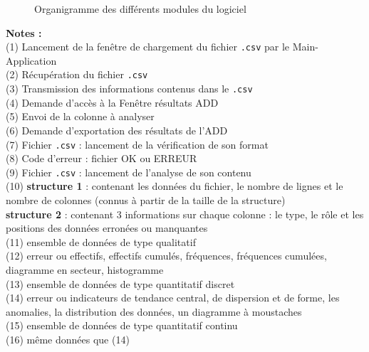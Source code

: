 \begin{figure}[h]
				\caption{Organigramme des différents modules du logiciel}\label{fig:M1}
				\end{figure}
				
				\textbf{Notes :}\\
				(1) Lancement de la fenêtre de chargement du fichier \lstinline!.csv! par le Main-Application\\
				(2) Récupération du fichier \lstinline!.csv! \\
				(3) Transmission des informations contenus dans le \lstinline!.csv!\\
				(4) Demande d'accès à la Fenêtre résultats ADD\\
				(5) Envoi de la colonne à analyser\\
				(6) Demande d'exportation des résultats de l'ADD\\
				(7) Fichier \lstinline!.csv! : lancement de la vérification de son format\\
				(8) Code d'erreur : fichier OK ou ERREUR\\
				(9) Fichier \lstinline!.csv! : lancement de l'analyse de son contenu\\
				(10) \textbf{structure 1} : contenant les données du fichier, le nombre de lignes et le nombre de colonnes (connus à partir de la taille de la structure)\\
				\hspace*{1.9em} \textbf{structure 2} : contenant 3 informations sur chaque colonne : le type, le rôle et les positions des données erronées ou manquantes\\
				(11) ensemble de données de type qualitatif\\
				(12) erreur ou effectifs, effectifs cumulés, fréquences, fréquences cumulées, diagramme en secteur, histogramme\\
				(13) ensemble de données de type quantitatif discret\\
				(14) erreur ou indicateurs de tendance central, de dispersion et de forme, les anomalies, la distribution des données, un diagramme à moustaches\\
				(15) ensemble de données de type quantitatif continu\\
				(16) même données que (14)
			
